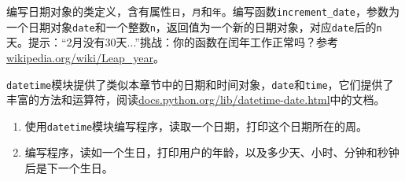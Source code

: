 \begin{ex}

编写日期对象的类定义，含有属性{\tt 日}，{\tt 月}和{\tt 年}。编写函数\verb"increment_date"，参数为一个日期对象{\tt date}和一个整数{\tt n}，返回值为一个新的日期对象，对应{\tt date}后的{\tt n}天。提示：“2月没有30天...”挑战：你的函数在闰年工作正常吗？参考\url{wikipedia.org/wiki/Leap_year}。

\end{ex}


\begin{ex}


{\tt datetime}模块提供了类似本章节中的日期和时间对象，{\tt date}和{\tt time}，它们提供了丰富的方法和运算符，阅读\url{docs.python.org/lib/datetime-date.html}中的文档。

\begin{enumerate}

\item 使用{\tt datetime}模块编写程序，读取一个日期，打印这个日期所在的周。


\item 编写程序，读如一个生日，打印用户的年龄，以及多少天、小时、分钟和秒钟后是下一个生日。
\end{enumerate}

\end{ex}

